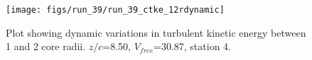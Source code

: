 \begin{figure}[H]
\centering
\texttt{[image: figs/run\_39/run\_39\_ctke\_12rdynamic]}
\caption{Plot showing dynamic variations in turbulent kinetic energy between 1 and 2 core radii. $z/c$=8.50, $V_{free}$=30.87, station 4.}
\label{fig:run_39_ctke_12rdynamic}
\end{figure}


